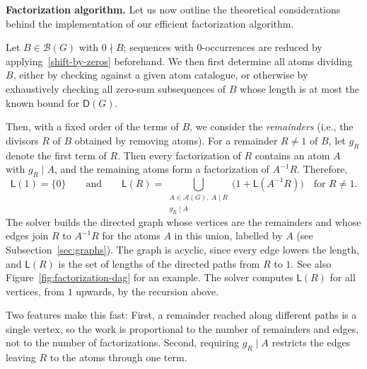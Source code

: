 \documentclass[a4paper, 10pt]{amsart}
\theoremstyle{plain}
\theoremstyle{definition}
\theoremstyle{definition}
\numberwithin{equation}{section}
\begin{document}
\noindent
\textbf{Factorization algorithm.}
Let us now outline the theoretical considerations behind the implementation
of our efficient factorization algorithm.

Let $B \in \mathcal B (G)$ with $0 \nmid B$; sequences with $0$-occurrences
are reduced by applying~\eqref{shift-by-zeros} beforehand.
We then first determine all atoms
dividing $B$, either by checking against a given atom catalogue, or otherwise
by exhaustively checking all zero-sum subsequences of $B$ whose length is
at most the known bound for $\mathsf{D}(G)$.

Then, with a fixed order of the
terms of $B$, we consider the \emph{remainders} (i.e., the divisors $R$ of $B$
obtained by removing atoms). For a remainder $R \neq 1$ of $B$, let $g_R$ denote
the first term of $R$. Then every factorization of $R$ contains an atom $A$ with
$g_R \mid A$, and the remaining atoms form a factorization of $A^{-1}R$. Therefore,
\[
 \mathsf L (1) = \{0\}
 \qquad \text{and} \qquad
 \mathsf L (R) = \bigcup_{\substack{A \in \mathcal A (G),\ A \mid R \\ g_R \mid A}} \bigl(1 + \mathsf L (A^{-1}R)\bigr)
 \quad \text{for } R \ne 1 .
\]
The solver builds the directed graph whose vertices are the remainders and
whose edges join $R$ to $A^{-1}R$ for the atoms $A$ in this union, labelled
by $A$ (see Subsection~\ref{sec:graphs}).  The graph is acyclic, since
every edge lowers the length, and $\mathsf L (R)$ is the set of lengths of
the directed paths from $R$ to $1$. See also Figure~\ref{fig:factorization-dag}
for an example.  The solver computes $\mathsf L (R)$ for all vertices,
from $1$ upwards, by the recursion above.

Two features make this fast:
First, a remainder reached along different paths is a single vertex, so the
work is proportional to the number of remainders and edges, not to the
number of factorizations.  Second, requiring $g_R \mid A$ restricts the
edges leaving $R$ to the atoms through one term.
\end{document}
